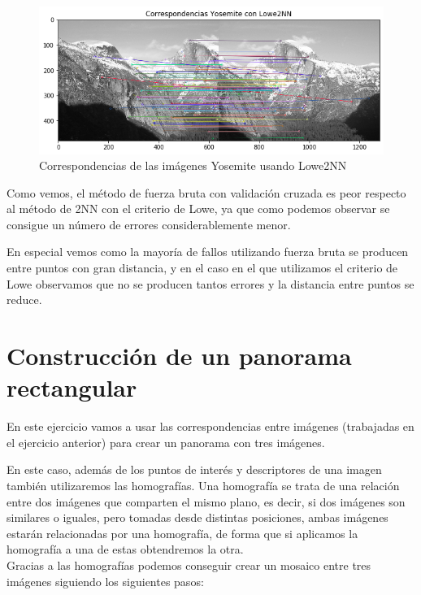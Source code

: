 \documentclass[12pt,spanish]{article}
\begin{document}
\begin{figure}[H]
	\centering
	\includegraphics[width=12cm]{./imagenes_memoria/corrLW.png}
	\caption{Correspondencias de las imágenes Yosemite usando Lowe2NN}
	\label{kp_yose2}
\end{figure}

Como vemos, el método de fuerza bruta con validación cruzada es peor respecto al método de 2NN con el criterio de Lowe, ya que como podemos observar se consigue un número de errores considerablemente menor.

En especial vemos como la mayoría de fallos utilizando fuerza bruta se producen entre puntos con gran distancia, y en el caso en el que utilizamos el criterio de Lowe observamos que no se producen tantos errores y la distancia entre puntos se reduce.

\section{Construcción de un panorama rectangular}
En este ejercicio vamos a usar las correspondencias entre imágenes (trabajadas en el ejercicio anterior) para crear un panorama con tres imágenes.

En este caso, además de los puntos de interés y descriptores de una imagen también utilizaremos las homografías. Una homografía se trata de una relación entre dos imágenes que comparten el mismo plano, es decir, si dos imágenes son similares o iguales, pero tomadas desde distintas posiciones, ambas imágenes estarán relacionadas por una homografía, de forma que si aplicamos la homografía a una de estas obtendremos la otra. \\

Gracias a las homografías podemos conseguir crear un mosaico entre tres imágenes siguiendo los siguientes pasos:
\end{document}

